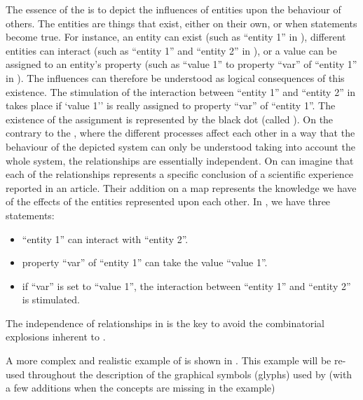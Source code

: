 The essence of the \ERs is to depict the influences of entities upon the behaviour of others. The entities are things that exist, either on their own, or when statements become true. For instance, an entity can exist (such as ``entity 1'' in ), different entities can interact (such as ``entity 1'' and ``entity 2'' in ), or a value can be assigned to an entity's property (such as ``value 1'' to property ``var'' of ``entity 1'' in ). The influences can therefore be understood as logical consequences of this existence. The stimulation of the interaction between ``entity 1'' and ``entity 2'' in  takes place if `value 1'' is really assigned to property ``var'' of ``entity 1''. The existence of the assignment is represented by the black dot (called ). On the contrary to the \PDl, where the different processes affect each other in a way that the behaviour of the depicted system can only be understood taking into account the whole system, the relationships are essentially independent. On can imagine that each of the relationships represents a specific conclusion of a scientific experience reported in an article. Their addition on a map represents the knowledge we have of the effects of the entities represented upon each other. In  , we have three statements: 

\begin{itemize}
 \item ``entity 1'' can interact with ``entity 2''.
 \item property ``var'' of ``entity 1'' can take the value ``value 1''.
 \item if ``var'' is set to ``value 1'', the interaction between ``entity 1'' and ``entity 2'' is stimulated.
\end{itemize}


The independence of relationships in \ERs is the key to avoid the combinatorial explosions inherent to \PDs.

A more complex and realistic example of \ERm is shown in . This example will be re-used throughout the description of the graphical symbols (glyphs) used by \SBGNERLone (with a few additions when the concepts are missing in the example) 

